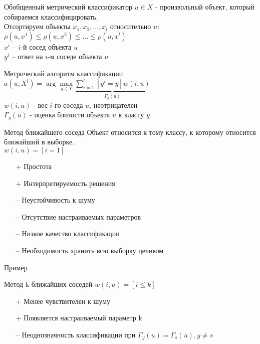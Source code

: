 \documentclass[10pt]{beamer}
\begin{document}
\begin{frame}{Обобщенный метрический классификатор}
	$u \in X$ - произвольный объект, который собираемся классифицировать.\\
	\bigbreak
	Отсортируем объекты $x_1, x_2, ..., x_l$ относительно $u$:
	${\rho(u, x^1) \leq \rho(u, x^2) \leq \dots \leq \rho(u, x^l)}$\\
	\bigbreak
	${x^i}$ -- $i$-й сосед объекта $u$\\
	${y^i}$ -- ответ на $i$-м соседе объекта $u$
\end{frame}

\begin{frame}{Метрический алгоритм классификации}
	${a(u, X^l) = \arg\max\limits_{y \in Y} \underbrace{\sum\limits_{i=1}^l [y^i = y]w(i, u)}_{\Gamma_y(u)} }$\\
	\vspace{5mm}
	$w(i, u)$ - вес $i$-го соседа $u$, неотрицателен\\
	$\Gamma_y(u)$ - оценка близости объекта $u$ к классу ${y}$
\end{frame}

\begin{frame}{Метод ближайшего соседа}
	Объект относится к тому классу, к которому относится ближайший в выборке.\\
	${w(i, u) = [i=1]}$\\
	\bigbreak
	\begin{itemize} [<+- | alert@+>]
		\item[+] Простота
		\item[+] Интерпретируемость решения
	  \bigbreak
		\item[--	] Неустойчивость к шуму
		\item[--	] Отсутствие настраиваемых параметров
		\item[--	] Низкое качество классификации
		\item[--	] Необходимость хранить всю выборку целиком		
	\end{itemize}
\end{frame}

\begin{frame}{Пример}
\end{frame}

\begin{frame}{Метод k ближайших соседей}
	${w(i, u) = [i \leq k]}$\\
	\bigbreak
	\begin{itemize} [<+- | alert@+>]
		\item[+] Менее чувствителен к шуму
		\item[+] Появляется настраиваемый параметр k
	  \bigbreak
	  \item[--] Неоднозначность классификации при ${\Gamma_y(u) = \Gamma_s(u), y \neq s}$
	\end{itemize}
\end{frame}
\end{document}
